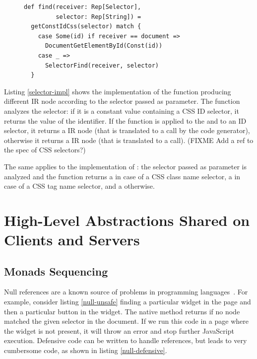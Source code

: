 \documentclass[preprint]{sigplanconf}
\begin{document}
\begin{figure}
\begin{lstlisting}[label=selector-impl,caption=Selectors optimization]
def find(receiver: Rep[Selector],
         selector: Rep[String]) =
  getConstIdCss(selector) match {
    case Some(id) if receiver == document =>
      DocumentGetElementById(Const(id))
    case _ =>
      SelectorFind(receiver, selector)
  }
\end{lstlisting}
\end{figure}

Listing \ref{selector-impl} shows the implementation of the  function producing different IR node
according to the selector passed as parameter. The  function analyzes the selector: if it
is a constant  value containing a CSS ID selector, it returns the value of the identifier. If the
 function is applied to the  and to an ID selector, it returns a
 IR node (that is translated to a  call by the code
generator), otherwise it returns a  IR node (that is translated to a 
call). (FIXME Add a ref to the spec of CSS selectors?)

The same applies to the implementation of : the selector passed as parameter is analyzed and the
function returns a  in case of a CSS class name selector, a
 in case of a CSS tag name selector, and a  otherwise.


\section{High-Level Abstractions Shared on Clients and Servers}
\label{contribution-shared}

\subsection{Monads Sequencing}

Null references are a known source of problems in programming languages~\cite{Hoare09_Null,Nanda09_Null}. For
example, consider listing \ref{null-unsafe} finding a particular widget in the page and then a particular
button in the widget. The native  method returns  if no node matched the given
selector in the document. If we run this code in a page where the widget is not present, it will throw an error
and stop further JavaScript execution. Defensive code can be written to handle  references, but leads to
very cumbersome code, as shown in listing \ref{null-defensive}.
\end{document}
